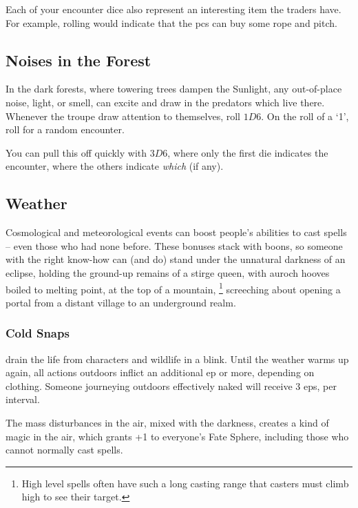 \begin{multicols}{2}
\encTraders

Each of your encounter dice also represent an interesting item the traders have.
For example, rolling  would indicate that the \glspl{pc} can buy some rope and pitch.

\subsection{Noises in the Forest}

In the dark forests, where towering trees dampen the Sunlight, any out-of-place noise, light, or smell, can excite and draw in the predators which live there.
Whenever the troupe draw attention to themselves, roll $1D6$.
On the roll of a `1', roll for a random encounter.

You can pull this off quickly with $3D6$, where only the first die indicates the encounter, where the others indicate \emph{which} (if any).

\subsection{Weather}
\label{weather}
Cosmological and meteorological events can boost people's abilities to cast spells -- even those who had none before.
These bonuses stack with \glspl{boon}, so someone with the right know-how can (and do) stand under the unnatural darkness of an eclipse, holding the ground-up remains of a stirge queen, with auroch hooves boiled to melting point, at the top of a mountain,%
\footnote{High level spells often have such a long casting range that casters must climb high to see their target.}
screeching about opening a portal from a distant \gls{village} to an underground realm.

\subsubsection{Cold Snaps}
drain the life from characters and wildlife in a blink.
Until the weather warms up again, all actions outdoors inflict an additional \gls{ep} or more, depending on clothing.
Someone journeying outdoors effectively naked will receive 3 \glspl{ep}, per \gls{interval}.

The mass disturbances in the air, mixed with the darkness, creates a kind of magic in the air, which grants +1 to everyone's Fate Sphere, including those who cannot normally cast spells.


\end{multicols}
